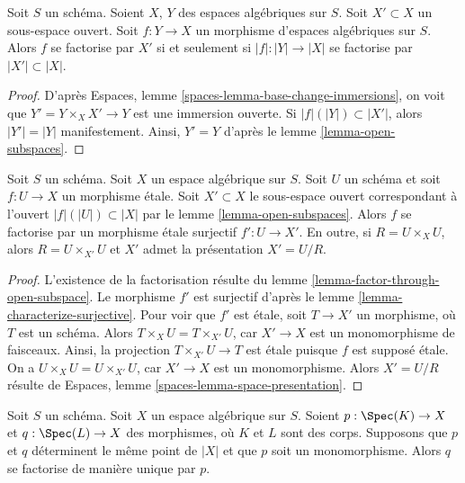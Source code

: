 \begin{lemma}
\label{lemma-factor-through-open-subspace}
Soit $S$ un schéma.
Soient $X$, $Y$ des espaces algébriques sur $S$.
Soit $X' \subset X$ un sous-espace ouvert.
Soit $f : Y \to X$ un morphisme d'espaces algébriques sur $S$.
Alors $f$ se factorise par $X'$ si et seulement si $|f| : |Y| \to |X|$
se factorise par $|X'| \subset |X|$.
\end{lemma}

\begin{proof}
D'après Espaces, lemme \ref{spaces-lemma-base-change-immersions},
on voit que $Y' = Y \times_X X' \to Y$ est une immersion ouverte.
Si $|f|(|Y|) \subset |X'|$, alors $|Y'| = |Y|$ manifestement. Ainsi, $Y' = Y$ d'après le
lemme \ref{lemma-open-subspaces}.
\end{proof}

\begin{lemma}
\label{lemma-etale-image-open}
Soit $S$ un schéma. Soit $X$ un espace algébrique sur $S$.
Soit $U$ un schéma et soit $f : U \to X$ un morphisme étale.
Soit $X' \subset X$ le sous-espace ouvert correspondant à
l'ouvert $|f|(|U|) \subset |X|$ par le
lemme \ref{lemma-open-subspaces}.
Alors $f$ se factorise par un morphisme étale surjectif $f' : U \to X'$.
En outre, si $R = U \times_X U$, alors $R = U \times_{X'} U$ et $X'$ admet
la présentation $X' = U/R$.
\end{lemma}

\begin{proof}
L'existence de la factorisation résulte du
lemme \ref{lemma-factor-through-open-subspace}.
Le morphisme $f'$ est surjectif d'après le
lemme \ref{lemma-characterize-surjective}.
Pour voir que $f'$ est étale, soit $T \to X'$ un morphisme,
où $T$ est un schéma. Alors $T \times_X U = T \times_{X'} U$,
car $X' \to X$ est un monomorphisme de faisceaux. Ainsi, la projection
$T \times_{X'} U \to T$ est étale puisque $f$ est supposé étale.
On a $U \times_X U = U \times_{X'} U$, car $X' \to X$ est un monomorphisme.
Alors $X' = U/R$ résulte de
Espaces, lemme \ref{spaces-lemma-space-presentation}.
\end{proof}

\begin{lemma}
\label{lemma-equivalence-class-point-monomorphism}
Soit $S$ un schéma. Soit $X$ un espace algébrique sur $S$.
Soient $p : \Spec(K) \to X$ et $q : \Spec(L) \to X$
des morphismes, où $K$ et $L$ sont des corps. Supposons que $p$ et $q$
déterminent le même point de $|X|$ et que $p$ soit un monomorphisme.
Alors $q$ se factorise de manière unique par $p$.
\end{lemma}

